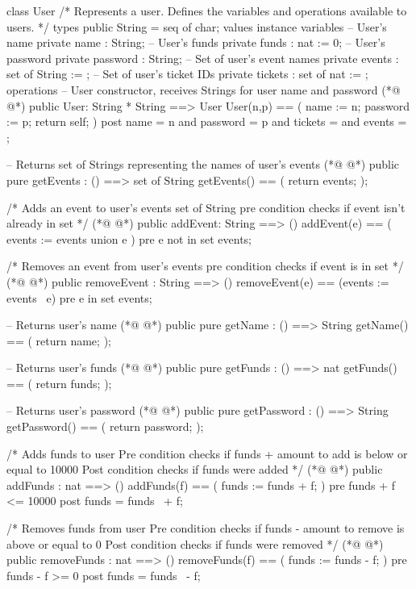 \begin{vdmpp}[breaklines=true]
class User
/*
  Represents a user.
  Defines the variables and operations available to users.
*/
types
  public String = seq of char;
values
instance variables
 -- User's name
 private name : String;
 -- User's funds
 private funds : nat := 0;
 -- User's password
 private password : String;
 -- Set of user's event names
 private events : set of String := {};
 -- Set of user's ticket IDs
 private tickets : set of nat := {};
operations
 -- User constructor, receives Strings for user name and password
(*@
\label{User:22}
@*)
 public User: String * String ==> User
 User(n,p) == (
  name := n;
  password := p;
  return self;
 )
 post name = n and password = p and tickets = {} and events = {};
 
 -- Returns set of Strings representing the names of user's events
(*@
\label{getEvents:31}
@*)
 public pure getEvents : () ==> set of String
 getEvents() == (
  return events;
 );
 
 /*
  Adds an event to user's events set of String
  pre condition checks if event isn't already in set
 */ 
(*@
\label{addEvent:40}
@*)
 public addEvent: String ==> ()
 addEvent(e) == (
  events := events union {e}
 )
 pre e not in set events;
 
 /*
  Removes an event from user's events
  pre condition checks if event is in set
 */ 
(*@
\label{removeEvent:50}
@*)
 public removeEvent : String ==> ()
 removeEvent(e) == (events := events \ {e})
 pre e in set events;
 
 -- Returns user's name
(*@
\label{getName:55}
@*)
 public pure getName : () ==> String
 getName() == (
  return name;
 );
 
 -- Returns user's funds
(*@
\label{getFunds:61}
@*)
 public pure getFunds : () ==> nat
 getFunds() == (
  return funds;
 );
 
 -- Returns user's password
(*@
\label{getPassword:67}
@*)
 public pure getPassword : () ==> String
 getPassword() == (
  return password;
 );
 
 /*
  Adds funds to user
  Pre condition checks if funds + amount to add is below or equal to 10000
  Post condition checks if funds were added
 */
(*@
\label{addFunds:77}
@*)
 public addFunds : nat ==> ()
 addFunds(f) == (
  funds := funds + f;
 )
 pre funds + f <= 10000
 post funds = funds~ + f;
 
 /*
  Removes funds from user
  Pre condition checks if funds - amount to remove is above or equal to 0
  Post condition checks if funds were removed
 */
(*@
\label{removeFunds:89}
@*)
 public removeFunds : nat ==> ()
 removeFunds(f) == (
  funds := funds - f;
 )
 pre funds - f >= 0
 post funds = funds~ - f;
 

\end{vdmpp}
